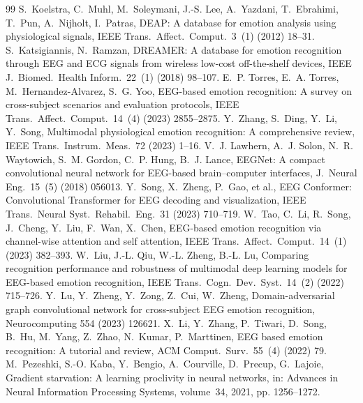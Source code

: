 \documentclass[a4paper,fleqn]{cas-sc}
\begin{document}
\begin{thebibliography}{99}
 S.~Koelstra, C.~Muhl, M.~Soleymani, J.-S. Lee, A.~Yazdani, T.~Ebrahimi, T.~Pun, A.~Nijholt, I.~Patras, DEAP: A database for emotion analysis using physiological signals, IEEE Trans.\ Affect.\ Comput.\ 3~(1) (2012) 18--31.
 S.~Katsigiannis, N.~Ramzan, DREAMER: A database for emotion recognition through EEG and ECG signals from wireless low-cost off-the-shelf devices, IEEE J.\ Biomed.\ Health Inform.\ 22~(1) (2018) 98--107.
 E.~P. Torres, E.~A. Torres, M.~Hernandez-Alvarez, S.~G. Yoo, EEG-based emotion recognition: A survey on cross-subject scenarios and evaluation protocols, IEEE Trans.\ Affect.\ Comput.\ 14~(4) (2023) 2855--2875.
 Y.~Zhang, S.~Ding, Y.~Li, Y.~Song, Multimodal physiological emotion recognition: A comprehensive review, IEEE Trans.\ Instrum.\ Meas.\ 72 (2023) 1--16.
 V.~J. Lawhern, A.~J. Solon, N.~R. Waytowich, S.~M. Gordon, C.~P. Hung, B.~J. Lance, EEGNet: A compact convolutional neural network for EEG-based brain--computer interfaces, J.\ Neural Eng.\ 15~(5) (2018) 056013.
 Y.~Song, X.~Zheng, P.~Gao, et al., EEG Conformer: Convolutional Transformer for EEG decoding and visualization, IEEE Trans.\ Neural Syst.\ Rehabil.\ Eng.\ 31 (2023) 710--719.
 W.~Tao, C.~Li, R.~Song, J.~Cheng, Y.~Liu, F.~Wan, X.~Chen, EEG-based emotion recognition via channel-wise attention and self attention, IEEE Trans.\ Affect.\ Comput.\ 14~(1) (2023) 382--393.
 W.~Liu, J.-L. Qiu, W.-L. Zheng, B.-L. Lu, Comparing recognition performance and robustness of multimodal deep learning models for EEG-based emotion recognition, IEEE Trans.\ Cogn.\ Dev.\ Syst.\ 14~(2) (2022) 715--726.
 Y.~Lu, Y.~Zheng, Y.~Zong, Z.~Cui, W.~Zheng, Domain-adversarial graph convolutional network for cross-subject EEG emotion recognition, Neurocomputing 554 (2023) 126621.
 X.~Li, Y.~Zhang, P.~Tiwari, D.~Song, B.~Hu, M.~Yang, Z.~Zhao, N.~Kumar, P.~Marttinen, EEG based emotion recognition: A tutorial and review, ACM Comput.\ Surv.\ 55~(4) (2022) 79.
 M.~Pezeshki, S.-O. Kaba, Y.~Bengio, A.~Courville, D.~Precup, G.~Lajoie, Gradient starvation: A learning proclivity in neural networks, in: Advances in Neural Information Processing Systems, volume~34, 2021, pp. 1256--1272.

\end{thebibliography}
\end{document}
